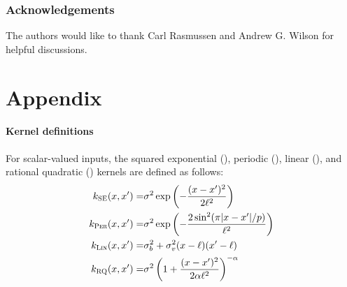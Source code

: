 \documentclass[twoside]{article}
\begin{document}
\subsubsection*{Acknowledgements}
The authors would like to thank Carl Rasmussen and Andrew G. Wilson for helpful discussions.

\appendix
\section{Appendix}
\label{appendix}
\paragraph{Kernel definitions}
For scalar-valued inputs, the squared exponential (\kSE), periodic (\kPer), linear (\kLin), and rational quadratic (\kRQ) kernels are defined as follows:
%
\begin{eqnarray*}
k_{\textsc{SE}}(x, x') =& \sigma^2\exp\left(-\frac{(x - x')^2}{2\ell^2}\right) \\
k_{\textsc{Per}}(x, x') =& \sigma^2\exp\left(-\frac{2\sin^2(\pi|x - x'|/p)}{\ell^2}\right) \\
k_{\textsc{Lin}}(x, x') =& \sigma_b^2 + \sigma_v^2(x - \ell)(x' - \ell) \\
k_{\textsc{RQ}}(x, x') =& \sigma^2\left( 1 + \frac{(x - x')^2}{2 \alpha \ell^2} \right)^{-\alpha}
\end{eqnarray*}
\end{document}
